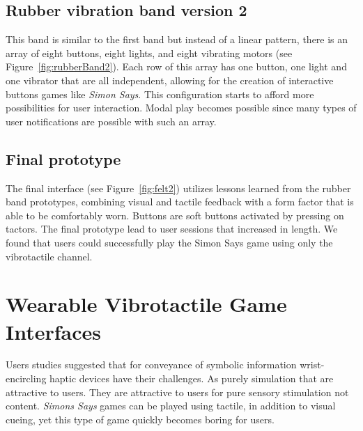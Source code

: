 \documentclass{chi-ext}
\begin{document}
\subsection{Rubber vibration band version 2}
This band is similar to the first band but instead of a linear pattern, there is an array of eight buttons, eight lights, and eight vibrating motors (see Figure~\ref{fig:rubberBand2}). Each row of this array has one button, one light and one vibrator that are all independent, allowing for the creation of interactive buttons games like \emph{Simon Says}. This configuration  starts to afford more possibilities for user interaction. Modal play becomes possible since many types of user notifications are possible with such an array. 

\subsection {Final prototype}
The final interface (see Figure~\ref{fig:felt2}) utilizes lessons learned from the rubber band prototypes, combining visual and tactile feedback with a form factor that is able to be comfortably worn. Buttons are soft buttons activated by pressing on tactors. The final prototype lead to user sessions that increased in length. We found that users could successfully play the Simon Says game using only the vibrotactile channel. 


\section{Wearable Vibrotactile Game Interfaces}
Users studies suggested that for conveyance of symbolic information wrist-encircling haptic devices have their challenges. As purely simulation that are attractive to users. They are attractive to users for pure sensory stimulation not content. \emph{Simons Says} games can be played using tactile, in addition to visual cueing,  yet this type of game quickly becomes boring for users. 

\end{document}
